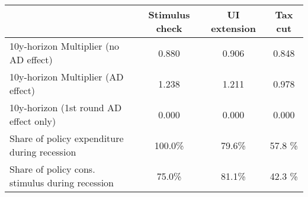 \begin{tabular}{@{}lccc@{}} 
\toprule 
& Stimulus check    & UI extension    & Tax cut     \\  \midrule 
10y-horizon Multiplier (no AD effect) &0.880  & 0.906  & 0.848     \\ 
10y-horizon Multiplier (AD effect) &1.238  & 1.211  & 0.978     \\ 
10y-horizon (1st round AD effect only) &0.000  & 0.000  & 0.000     \\ 
Share of policy expenditure during recession &100.0\%  & 79.6\%  & 57.8 \%    \\ 
Share of policy cons. stimulus during recession &75.0\%  & 81.1\%  & 42.3 \%    \\ \bottomrule 
\end{tabular}  
